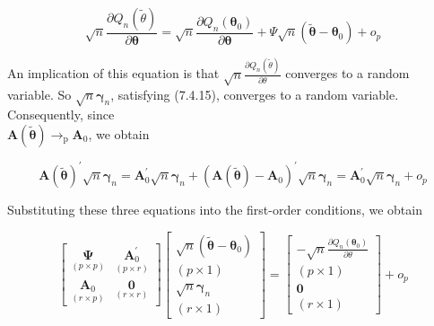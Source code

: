 \documentclass[10pt]{article}
\begin{document}
\begin{equation*}
\sqrt{n} \frac{\partial Q_{n}(\tilde{\theta})}{\partial \boldsymbol{\theta}}=\sqrt{n} \frac{\partial Q_{n}\left(\boldsymbol{\theta}_{0}\right)}{\partial \boldsymbol{\theta}}+\Psi \sqrt{n}\left(\tilde{\boldsymbol{\theta}}-\boldsymbol{\theta}_{0}\right)+o_{p} \tag{7.4.18}
\end{equation*}


An implication of this equation is that $\sqrt{n} \frac{\partial Q_{n}(\tilde{\theta})}{\partial \theta}$ converges to a random variable. So $\sqrt{n} \boldsymbol{\gamma}_{n}$, satisfying (7.4.15), converges to a random variable. Consequently, since\\
$\mathbf{A}(\tilde{\boldsymbol{\theta}}) \rightarrow_{\mathrm{p}} \mathbf{A}_{0}$, we obtain


\begin{equation*}
\mathbf{A}(\tilde{\boldsymbol{\theta}})^{\prime} \sqrt{n} \boldsymbol{\gamma}_{n}=\mathbf{A}_{0}^{\prime} \sqrt{n} \boldsymbol{\gamma}_{n}+\left(\mathbf{A}(\tilde{\boldsymbol{\theta}})-\mathbf{A}_{0}\right)^{\prime} \sqrt{n} \boldsymbol{\gamma}_{n}=\mathbf{A}_{0}^{\prime} \sqrt{n} \boldsymbol{\gamma}_{n}+o_{p} \tag{7.4.19}
\end{equation*}


Substituting these three equations into the first-order conditions, we obtain

\[
\left[\begin{array}{cc}
\underset{(p \times p)}{\boldsymbol{\Psi}} & \underset{(p \times r)}{\mathbf{A}_{0}^{\prime}}  \tag{7.4.20}\\
\underset{(r \times p)}{\mathbf{A}_{0}} & \underset{(r \times r)}{\mathbf{0}}
\end{array}\right]\left[\begin{array}{c}
\sqrt{n}\left(\tilde{\boldsymbol{\theta}}-\boldsymbol{\theta}_{0}\right) \\
(p \times 1) \\
\sqrt{n} \boldsymbol{\gamma}_{n} \\
(r \times 1)
\end{array}\right]=\left[\begin{array}{c}
-\sqrt{n} \frac{\partial Q_{n}\left(\boldsymbol{\theta}_{0}\right)}{\partial \theta} \\
(p \times 1) \\
\mathbf{0} \\
(r \times 1)
\end{array}\right]+o_{p}
\]
\end{document}
